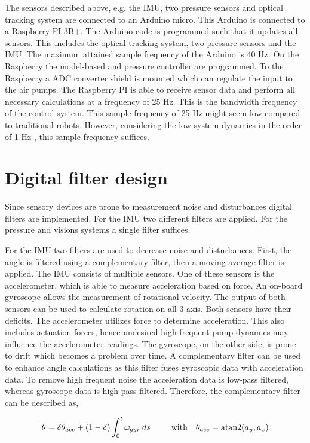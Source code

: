 The sensors described above, e.g. the IMU, two pressure sensors and optical tracking system are connected to an Arduino micro. This Arduino is connected to a Raspberry PI 3B+. The Arduino code is programmed such that it updates all sensors. This includes the optical tracking system, two pressure sensors and the IMU. The maximum attained sample frequency of the Arduino is 40 Hz. On the Raspberry the model-based and pressure controller are programmed. To the Raspberry a ADC converter shield is mounted which can regulate the input to the air pumps. The Raspberry PI is able to receive sensor data and perform all necessary calculations at a frequency of 25 Hz. This is the bandwidth frequency of the control system. This sample frequency of 25 Hz might seem low compared to traditional robots. However, considering the low system dynamics in the order of 1 Hz \cite{tawk2018bioinspired},\cite{HighBandwidthControl} this sample frequency suffices.  

\section{Digital filter design}

Since sensory devices are prone to measurement noise and disturbances digital filters are implemented. For the IMU two different filters are applied. For the pressure and visions systems a single filter suffices. 

For the IMU two filters are used to decrease noise and disturbances. First, the angle is filtered using a complementary filter, then a moving average filter is applied. The IMU consists of multiple sensors. One of these sensors is the accelerometer, which is able to measure acceleration based on force. An on-board gyroscope allows the measurement of rotational velocity. The output of both sensors can be used to calculate rotation on all 3 axis. Both sensors have their deficits. The accelerometer utilizes force to determine acceleration. This also includes actuation forces, hence undesired high frequent pump dynamics may influence the accelerometer readings. The gyroscope, on the other side, is prone to drift which becomes a problem over time. A complementary filter can be used to enhance angle calculations as this filter fuses gyroscopic data with acceleration data. To remove high frequent noise the acceleration data is low-pass filtered, whereas gyroscope data is high-pass filtered. Therefore, the complementary filter can be described as, 

\begin{equation}
    \theta_{} = \delta \theta_{acc} + (1-\delta) \int_0^t \omega_{gyr} \hspace{2pt} ds    \hspace{25pt} \text{with}  \hspace{10pt} \theta_{acc} = \operatorname{atan2}(a_y,a_x)
\end{equation}

